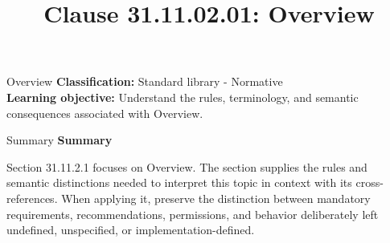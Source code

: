 \documentclass[10pt,letterpaper]{article}
\title{Clause 31.11.02.01: Overview}
\author{}
\date{}
\begin{document}
\maketitle
\begin{CornellOverviewBox}{Overview}
\textbf{Classification:} Standard library - Normative\\[2pt]
\textbf{Learning objective:} Understand the rules, terminology, and semantic consequences associated with Overview.
\end{CornellOverviewBox}\begin{CornellSummaryBox}{Summary}
{\sffamily\bfseries\color{Accent} Summary}\par\vspace{3pt}Section 31.11.2.1 focuses on Overview. The section supplies the rules and semantic distinctions needed to interpret this topic in context with its cross-references. When applying it, preserve the distinction between mandatory requirements, recommendations, permissions, and behavior deliberately left undefined, unspecified, or implementation-defined.
\end{CornellSummaryBox}
\end{document}
